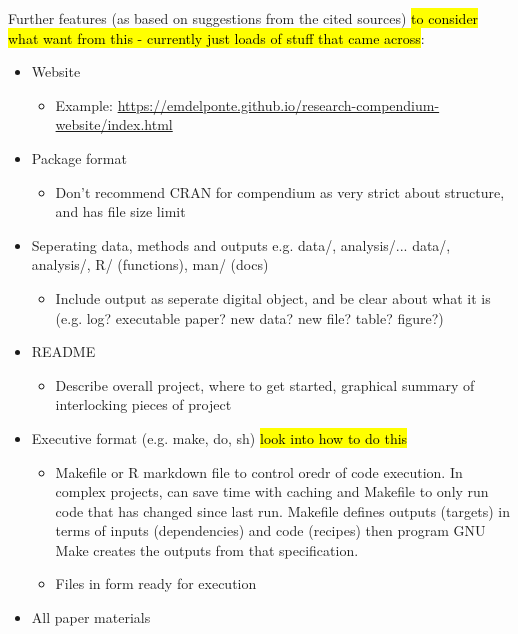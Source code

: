 Further features (as based on suggestions from the cited sources) \hl{to consider what want from this - currently just loads of stuff that came across}:
\begin{itemize}
    \item Website
    \begin{itemize}
        \item Example: \url{https://emdelponte.github.io/research-compendium-website/index.html}
    \end{itemize}
    \item Package format\autocite{krafczyk_learning_2021}
    \begin{itemize}
        \item Don't recommend CRAN for compendium as very strict about structure, and has file size limit \autocite{marwick_packaging_2018}
    \end{itemize}
    \item Seperating data, methods and outputs e.g. data/, analysis/... data/, analysis/, R/ (functions), man/ (docs)\autocite{marwick_packaging_2018}
    \begin{itemize}
        \item Include output as seperate digital object, and be clear about what it is (e.g. log? executable paper? new data? new file? table? figure?) \autocite{arguillas_10_2022}
    \end{itemize}
    \item README
    \begin{itemize}
        \item Describe overall project, where to get started, graphical summary of interlocking pieces of project\autocite{marwick_packaging_2018}
    \end{itemize}
    \item Executive format (e.g. make, do, sh) \hl{look into how to do this}
    \begin{itemize}
        \item Makefile or R markdown file to control oredr of code execution. In complex projects, can save time with caching and Makefile to only run code that has changed since last run. Makefile defines outputs (targets) in terms of inputs (dependencies) and code (recipes) then program GNU Make creates the outputs from that specification.\autocite{marwick_packaging_2018}
        \item Files in form ready for execution \autocite{arguillas_10_2022}
    \end{itemize}
    \item All paper materials

\end{itemize}

